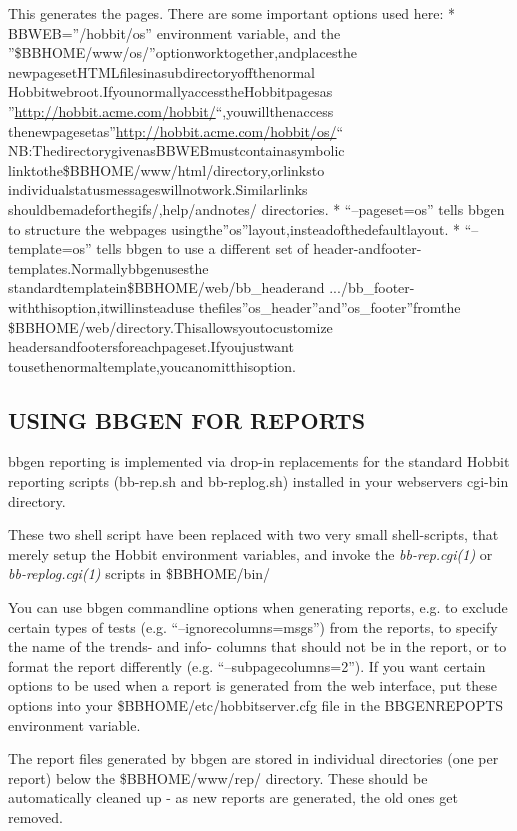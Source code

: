   This generates the pages. There are some important options used here:  
 * BBWEB=''/hobbit/os'' environment variable, and the  
''\$BBHOME/www/os/''optionworktogether,andplacesthe  
newpagesetHTMLfilesinasubdirectoryoffthenormal  
Hobbitwebroot.IfyounormallyaccesstheHobbitpagesas  
''\url{http://hobbit.acme.com/hobbit/}``,youwillthenaccess  
thenewpagesetas''\url{http://hobbit.acme.com/hobbit/os/}``  
NB:ThedirectorygivenasBBWEBmustcontainasymbolic  
linktothe\$BBHOME/www/html/directory,orlinksto  
individualstatusmessageswillnotwork.Similarlinks  
shouldbemadeforthegifs/,help/andnotes/  
directories.  
 * ``--pageset=os'' tells bbgen to structure the webpages  
usingthe''os''layout,insteadofthedefaultlayout.  
 * ``--template=os'' tells bbgen to use a different set of  
header-andfooter-templates.Normallybbgenusesthe  
standardtemplatein\$BBHOME/web/bb\_headerand  
.../bb\_footer-withthisoption,itwillinsteaduse  
thefiles''os\_header''and''os\_footer''fromthe  
\$BBHOME/web/directory.Thisallowsyoutocustomize  
headersandfootersforeachpageset.Ifyoujustwant  
tousethenormaltemplate,youcanomitthisoption. 


 
\subsection{USING BBGEN FOR REPORTS}
 bbgen reporting is implemented via drop-in replacements for the standard Hobbit reporting scripts (bb-rep.sh and bb-replog.sh) installed in your webservers cgi-bin directory. 

  These two shell script have been replaced with two very small
  shell-scripts, that merely setup the Hobbit environment variables,
  and invoke the \emph{bb-rep.cgi(1)} or \emph{bb-replog.cgi(1)}
  scripts in \$BBHOME/bin/ 



  You can use bbgen commandline options when generating reports,
  e.g. to exclude certain types of tests
  (e.g. ``--ignorecolumns=msgs'') from the reports, to specify the
  name of the trends- and info- columns that should not be in the
  report, or to format the report differently
  (e.g. ``--subpagecolumns=2''). If you want certain options to be
  used when a report is generated from the web interface, put these
  options into your \$BBHOME/etc/hobbitserver.cfg file in the
  BBGENREPOPTS environment variable. 



  The report files generated by bbgen are stored in individual
  directories (one per report) below the \$BBHOME/www/rep/
  directory. These should be automatically cleaned up - as new reports
  are generated, the old ones get removed. 



